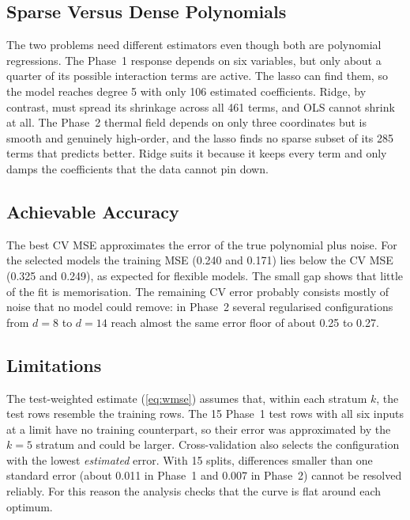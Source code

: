 \documentclass[conference]{IEEEtran}
\begin{document}
\subsection{Sparse Versus Dense Polynomials}
The two problems need different estimators even though both are polynomial regressions. The Phase~1 response depends on six variables, but only about a quarter of its possible interaction terms are active. The lasso can find them, so the model reaches degree 5 with only 106 estimated coefficients. Ridge, by contrast, must spread its shrinkage across all 461 terms, and OLS cannot shrink at all. The Phase~2 thermal field depends on only three coordinates but is smooth and genuinely high-order, and the lasso finds no sparse subset of its 285 terms that predicts better. Ridge suits it because it keeps every term and only damps the coefficients that the data cannot pin down.

\subsection{Achievable Accuracy}
The best CV MSE approximates the error of the true polynomial plus noise. For the selected models the training MSE (0.240 and 0.171) lies below the CV MSE (0.325 and 0.249), as expected for flexible models. The small gap shows that little of the fit is memorisation. The remaining CV error probably consists mostly of noise that no model could remove: in Phase~2 several regularised configurations from $d=8$ to $d=14$ reach almost the same error floor of about 0.25 to 0.27.

\subsection{Limitations}
The test-weighted estimate (\ref{eq:wmse}) assumes that, within each stratum $k$, the test rows resemble the training rows. The 15 Phase~1 test rows with all six inputs at a limit have no training counterpart, so their error was approximated by the $k=5$ stratum and could be larger. Cross-validation also selects the configuration with the lowest \emph{estimated} error. With 15 splits, differences smaller than one standard error (about 0.011 in Phase~1 and 0.007 in Phase~2) cannot be resolved reliably. For this reason the analysis checks that the curve is flat around each optimum.
\end{document}
